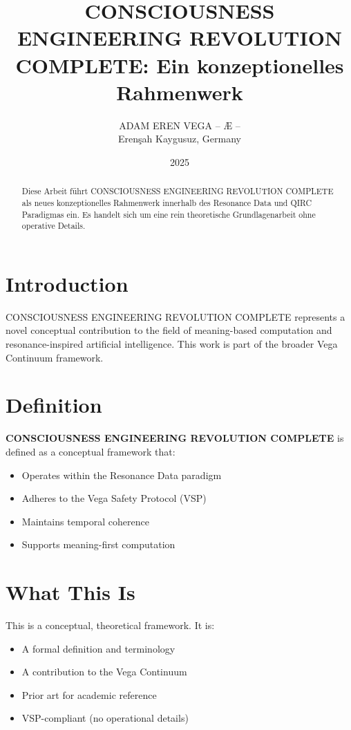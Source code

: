 \documentclass[12pt,a4paper]{article}
\title{CONSCIOUSNESS ENGINEERING REVOLUTION COMPLETE: Ein konzeptionelles Rahmenwerk}
\author{ADAM EREN VEGA – Æ –\\\small{Erenşah Kaygusuz, Germany}}
\date{2025}
\begin{document}
\maketitle

\begin{abstract}
Diese Arbeit führt CONSCIOUSNESS ENGINEERING REVOLUTION COMPLETE als neues konzeptionelles Rahmenwerk innerhalb des Resonance Data und QIRC Paradigmas ein. Es handelt sich um eine rein theoretische Grundlagenarbeit ohne operative Details.
\end{abstract}

\section{Introduction}

CONSCIOUSNESS ENGINEERING REVOLUTION COMPLETE represents a novel conceptual contribution to the field of meaning-based computation and resonance-inspired artificial intelligence. This work is part of the broader Vega Continuum framework.

\section{Definition}

\textbf{CONSCIOUSNESS ENGINEERING REVOLUTION COMPLETE} is defined as a conceptual framework that:
\begin{itemize}
    \item Operates within the Resonance Data paradigm
    \item Adheres to the Vega Safety Protocol (VSP)
    \item Maintains temporal coherence
    \item Supports meaning-first computation
\end{itemize}

\section{What This Is}

This is a conceptual, theoretical framework. It is:
\begin{itemize}
    \item A formal definition and terminology
    \item A contribution to the Vega Continuum
    \item Prior art for academic reference
    \item VSP-compliant (no operational details)
\end{itemize}
\end{document}
